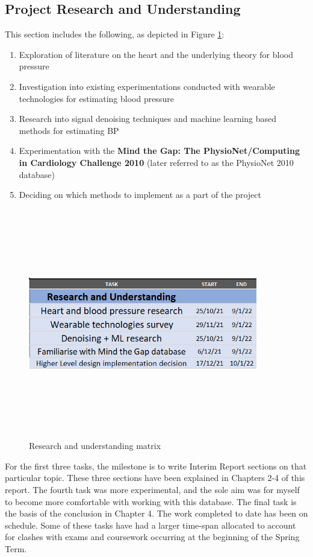\documentclass[11pt, a4paper]{article}
\begin{document}
\subsection{Project Research and Understanding}
 This section includes the following, as depicted in Figure \ref{gantt1}: \begin{enumerate}
    \item Exploration of literature on the heart and the underlying theory for blood pressure
    \item Investigation into existing experimentations conducted with wearable technologies for estimating blood pressure
    \item Research into signal denoising techniques and machine learning based methods for estimating BP
    \item Experimentation with the \textbf{Mind the Gap: The PhysioNet/Computing in Cardiology Challenge 2010} (later referred to as the PhysioNet 2010 database) \cite{challenge2010}
    \item Deciding on which methods to implement as a part of the project
\end{enumerate} \begin{figure}[H]
    \centering
    \includegraphics[width=10cm,height=10cm,keepaspectratio]{Figures/part1_gantt.png}
    \caption{Research and understanding matrix}
    \label{gantt1}
\end{figure} \noindent For the first three tasks, the milestone is to write Interim Report sections on that particular topic. These three sections have been explained in Chapters 2-4 of this report. The fourth task was more experimental, and the sole aim was for myself to become more comfortable with working with this database. The final task is the basis of the conclusion in Chapter 4. The work completed to date has been on schedule. Some of these tasks have had a larger time-span allocated to account for clashes with exams and coursework occurring at the beginning of the Spring Term.
\end{document}
